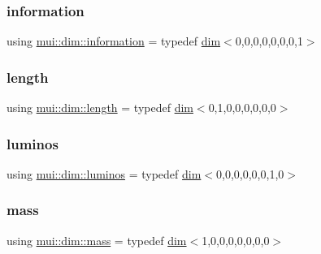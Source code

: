\mbox{\label{namespacemui_1_1dim_abee516dc27b7ef30e706ffc9ce0ea363}} 
\subsubsection{\texorpdfstring{information}{information}}
{\footnotesize\ttfamily using \hyperlink{namespacemui_1_1dim_abee516dc27b7ef30e706ffc9ce0ea363}{mui\+::dim\+::information} = typedef \hyperlink{structmui_1_1dim_1_1dim}{dim}$<$0,0,0,0,0,0,0,1$>$}

\mbox{\label{namespacemui_1_1dim_ade9a9679bc46e16322ef419974faebe6}} 
\subsubsection{\texorpdfstring{length}{length}}
{\footnotesize\ttfamily using \hyperlink{namespacemui_1_1dim_ade9a9679bc46e16322ef419974faebe6}{mui\+::dim\+::length} = typedef \hyperlink{structmui_1_1dim_1_1dim}{dim}$<$0,1,0,0,0,0,0,0$>$}

\mbox{\label{namespacemui_1_1dim_aaa6d47b51b672a8e7b7c549d6a437977}} 
\subsubsection{\texorpdfstring{luminos}{luminos}}
{\footnotesize\ttfamily using \hyperlink{namespacemui_1_1dim_aaa6d47b51b672a8e7b7c549d6a437977}{mui\+::dim\+::luminos} = typedef \hyperlink{structmui_1_1dim_1_1dim}{dim}$<$0,0,0,0,0,0,1,0$>$}

\mbox{\label{namespacemui_1_1dim_a7b17424f4316e37d7970ee09857ccddf}} 
\subsubsection{\texorpdfstring{mass}{mass}}
{\footnotesize\ttfamily using \hyperlink{namespacemui_1_1dim_a7b17424f4316e37d7970ee09857ccddf}{mui\+::dim\+::mass} = typedef \hyperlink{structmui_1_1dim_1_1dim}{dim}$<$1,0,0,0,0,0,0,0$>$}

